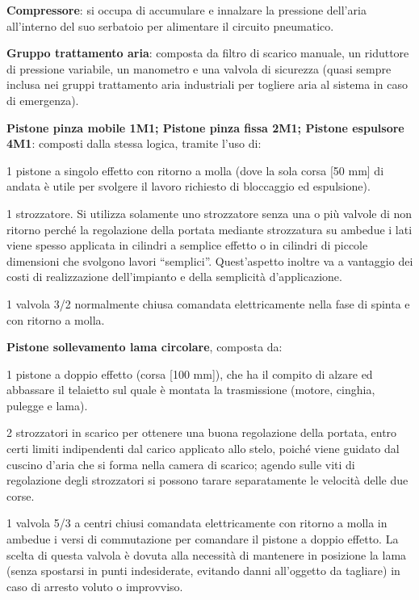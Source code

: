 \documentclass{report}
\begin{document}
\begin{description}
\item \textbf{Compressore}: si occupa di accumulare e innalzare la pressione dell’aria all’interno del suo serbatoio per alimentare il circuito pneumatico.

\item \textbf{Gruppo trattamento aria}: composta da filtro di scarico manuale, un riduttore di pressione variabile, un manometro e una valvola di sicurezza (quasi sempre inclusa nei gruppi trattamento aria industriali per togliere aria al sistema in caso di emergenza).

\item \textbf{Pistone pinza mobile 1M1; Pistone pinza fissa 2M1; Pistone espulsore 4M1}: composti dalla stessa logica, tramite l'uso di:

    \begin{description}
    \item{1 pistone a singolo effetto con ritorno a molla (dove la sola corsa [50 mm] di andata è utile per svolgere il lavoro richiesto di bloccaggio ed espulsione).}
    \item{1 strozzatore. Si utilizza solamente uno strozzatore senza una o più valvole di non ritorno perché la regolazione della portata mediante strozzatura su ambedue i lati viene spesso applicata in cilindri a semplice effetto o in cilindri di piccole dimensioni che svolgono lavori “semplici”. Quest’aspetto inoltre va a vantaggio dei costi di realizzazione dell’impianto e della semplicità d’applicazione.}
     \item{1 valvola 3/2 normalmente chiusa comandata elettricamente nella fase di spinta e con ritorno a molla.}

    \end{description}

\item \textbf{Pistone sollevamento lama circolare}, composta da:

     \begin{description}
    \item{1 pistone a doppio effetto (corsa [100 mm]), che ha il compito di alzare ed abbassare il telaietto sul quale è montata la trasmissione (motore, cinghia, pulegge e lama).}
    \item{2 strozzatori in scarico per ottenere una buona regolazione della portata, entro certi limiti indipendenti dal carico applicato allo stelo, poiché viene guidato dal cuscino d’aria che si forma nella camera di scarico; agendo sulle viti di regolazione degli strozzatori si possono tarare separatamente le velocità delle due corse.}
     \item{1 valvola 5/3 a centri chiusi comandata elettricamente con ritorno a molla in ambedue i versi di commutazione per comandare il pistone a doppio effetto. La scelta di questa valvola è dovuta alla necessità di mantenere in posizione la lama (senza spostarsi in punti indesiderate, evitando danni all’oggetto da tagliare) in caso di arresto voluto o improvviso.}


\end{description}
\end{description}
\end{document}
